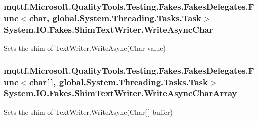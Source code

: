 \hypertarget{class_system_1_1_i_o_1_1_fakes_1_1_shim_text_writer_ad70095dc2c75fe552873edd570a1c744}{
\subsubsection[{Write\-Async\-Char}]{\setlength{\rightskip}{0pt plus 5cm}mqttf.\-Microsoft.\-Quality\-Tools.\-Testing.\-Fakes.\-Fakes\-Delegates.\-Func$<$char, global.\-System.\-Threading.\-Tasks.\-Task$>$ System.\-I\-O.\-Fakes.\-Shim\-Text\-Writer.\-Write\-Async\-Char\hspace{0.3cm}{\ttfamily [set]}}}\label{class_system_1_1_i_o_1_1_fakes_1_1_shim_text_writer_ad70095dc2c75fe552873edd570a1c744}


Sets the shim of Text\-Writer.\-Write\-Async(\-Char value)

\hypertarget{class_system_1_1_i_o_1_1_fakes_1_1_shim_text_writer_a8bdd1c65a464c218a1a6fd3c21251f94}{
\subsubsection[{Write\-Async\-Char\-Array}]{\setlength{\rightskip}{0pt plus 5cm}mqttf.\-Microsoft.\-Quality\-Tools.\-Testing.\-Fakes.\-Fakes\-Delegates.\-Func$<$char\mbox{[}$\,$\mbox{]}, global.\-System.\-Threading.\-Tasks.\-Task$>$ System.\-I\-O.\-Fakes.\-Shim\-Text\-Writer.\-Write\-Async\-Char\-Array\hspace{0.3cm}{\ttfamily [set]}}}\label{class_system_1_1_i_o_1_1_fakes_1_1_shim_text_writer_a8bdd1c65a464c218a1a6fd3c21251f94}


Sets the shim of Text\-Writer.\-Write\-Async(\-Char\mbox{[}$\,$\mbox{]} buffer)

